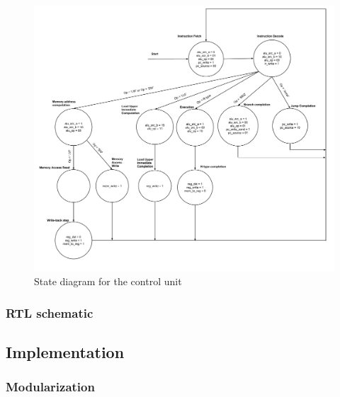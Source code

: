 \begin{figure}[ht!]
    \begin{center}
    \includegraphics[width=\textwidth]{assets/state_machine.pdf}
    \caption{State diagram for the control unit}
    \label{fig:state_machine}
    \end{center}
\end{figure}

\subsubsection{RTL schematic}

\subsection{Implementation}

\subsubsection{Modularization}

